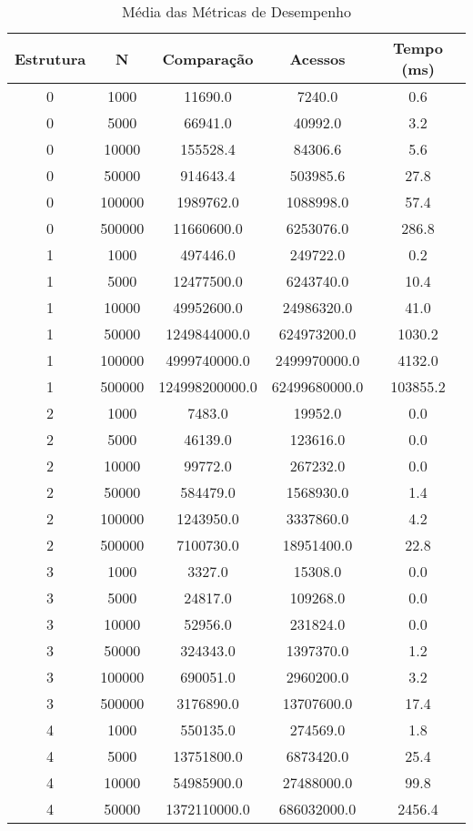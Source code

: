 \begin{table}[htbp]
\caption{Média das Métricas de Desempenho}
\label{tab:table1}
\begin{tabular}{c|c|c|c|c}
\textbf{Estrutura} & \textbf{N} & \textbf{Comparação} & \textbf{Acessos} & \textbf{Tempo (ms)}\\
\hline
0 & 1000 & 11690.0 & 7240.0 & 0.6\\
0 & 5000 & 66941.0 & 40992.0 & 3.2\\
0 & 10000 & 155528.4 & 84306.6 & 5.6\\
0 & 50000 & 914643.4 & 503985.6 & 27.8\\
0 & 100000 & 1989762.0 & 1088998.0 & 57.4\\
0 & 500000 & 11660600.0 & 6253076.0 & 286.8\\
1 & 1000 & 497446.0 & 249722.0 & 0.2\\
1 & 5000 & 12477500.0 & 6243740.0 & 10.4\\
1 & 10000 & 49952600.0 & 24986320.0 & 41.0\\
1 & 50000 & 1249844000.0 & 624973200.0 & 1030.2\\
1 & 100000 & 4999740000.0 & 2499970000.0 & 4132.0\\
1 & 500000 & 124998200000.0 & 62499680000.0 & 103855.2\\
2 & 1000 & 7483.0 & 19952.0 & 0.0\\
2 & 5000 & 46139.0 & 123616.0 & 0.0\\
2 & 10000 & 99772.0 & 267232.0 & 0.0\\
2 & 50000 & 584479.0 & 1568930.0 & 1.4\\
2 & 100000 & 1243950.0 & 3337860.0 & 4.2\\
2 & 500000 & 7100730.0 & 18951400.0 & 22.8\\
3 & 1000 & 3327.0 & 15308.0 & 0.0\\
3 & 5000 & 24817.0 & 109268.0 & 0.0\\
3 & 10000 & 52956.0 & 231824.0 & 0.0\\
3 & 50000 & 324343.0 & 1397370.0 & 1.2\\
3 & 100000 & 690051.0 & 2960200.0 & 3.2\\
3 & 500000 & 3176890.0 & 13707600.0 & 17.4\\
4 & 1000 & 550135.0 & 274569.0 & 1.8\\
4 & 5000 & 13751800.0 & 6873420.0 & 25.4\\
4 & 10000 & 54985900.0 & 27488000.0 & 99.8\\
4 & 50000 & 1372110000.0 & 686032000.0 & 2456.4\\

\end{tabular}
\end{table}
